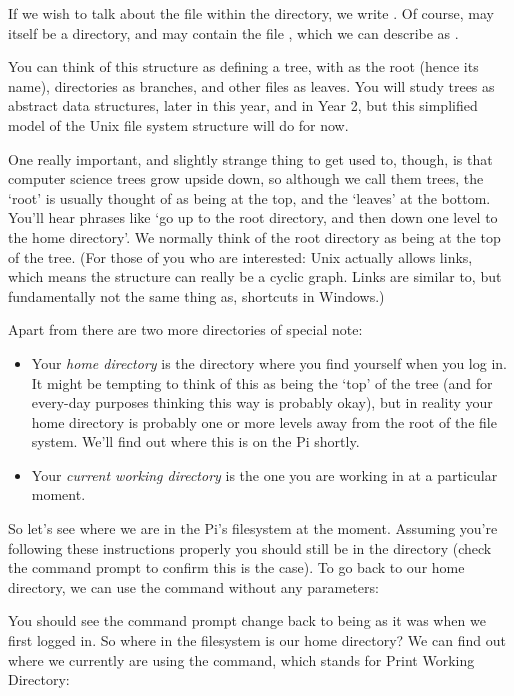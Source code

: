 If we wish to talk about the file  within the directory,  we write . Of course,  may itself be a directory, and may contain the file , which we can describe as .

You can think of this structure as defining a tree, with \fname{/} as the root (hence its name), directories as branches, and other files as leaves. You will study trees as abstract data structures, later in this year, and in Year 2, but this simplified model of the Unix file system structure will do for now. 

One really important, and slightly strange thing to get used to, though, is that computer science trees grow upside down, so although we call them trees, the `root' is usually thought of as being at the top, and the `leaves' at the bottom. You'll hear phrases like `go up to the root directory, and then down one level to the home directory'. We normally think of the root directory as being at the top of the tree. (For those of you who are interested: Unix actually allows links, which means the structure can really be a cyclic graph. Links are similar to, but fundamentally not the same thing as, shortcuts in Windows.)

Apart from \fname{/} there are two more directories of special note:
\begin{itemize}
\item Your \textit{home directory} is the directory where you find yourself when you log in. It might be tempting to think of this as being the `top' of the tree (and for every-day purposes thinking this way is probably okay), but in reality your home directory is probably one or more levels away from the root of the file system. We'll find out where this is on the Pi shortly. 
\item Your \textit{current working directory} is the one you are working in at a particular moment. \end{itemize}

So let's see where we are in the Pi's filesystem at the moment. Assuming you're following these instructions properly you should still be in the  directory (check the command prompt to confirm this is the case). To go back to our home directory, we can use the  command without any parameters:

You should see the command prompt change back to being as it was when we first logged in. So where in the filesystem is our home directory? We can find out where we currently are using the  command, which stands for Print Working Directory:

